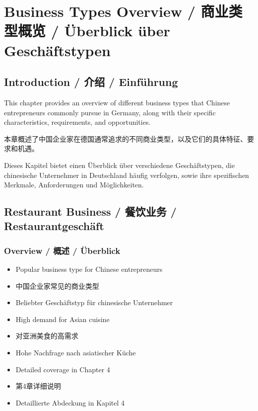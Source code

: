 \chapter{Business Types Overview / 商业类型概览 / Überblick über Geschäftstypen}

\section{Introduction / 介绍 / Einführung}

This chapter provides an overview of different business types that Chinese entrepreneurs commonly pursue in Germany, along with their specific characteristics, requirements, and opportunities.

本章概述了中国企业家在德国通常追求的不同商业类型，以及它们的具体特征、要求和机遇。

Dieses Kapitel bietet einen Überblick über verschiedene Geschäftstypen, die chinesische Unternehmer in Deutschland häufig verfolgen, sowie ihre spezifischen Merkmale, Anforderungen und Möglichkeiten.

\section{Restaurant Business / 餐饮业务 / Restaurantgeschäft}

\subsection{Overview / 概述 / Überblick}
\begin{itemize}
    \item Popular business type for Chinese entrepreneurs
    \item 中国企业家常见的商业类型
    \item Beliebter Geschäftstyp für chinesische Unternehmer
    \item High demand for Asian cuisine
    \item 对亚洲美食的高需求
    \item Hohe Nachfrage nach asiatischer Küche
    \item Detailed coverage in Chapter 4
    \item 第4章详细说明
    \item Detaillierte Abdeckung in Kapitel 4
\end{itemize}

